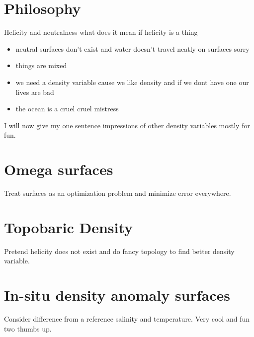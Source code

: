 \documentclass[11pt]{article}
\begin{document}
\section{Philosophy}
\label{sec:orge901af2}
Helicity and neutralness what does it mean if helicity is a thing
\begin{itemize}
\item neutral surfaces don't exist and water doesn't travel neatly on surfaces sorry
\item things are mixed
\item we need a density variable cause we like density and if we dont have one our lives are bad
\item the ocean is a cruel cruel mistress
\end{itemize}

I will now give my one sentence impressions of other density variables mostly for fun.

\section{Omega surfaces}
\label{sec:org78bb93d}
Treat surfaces as an optimization problem and minimize error everywhere.

\section{Topobaric Density}
\label{sec:orgbbca689}
Pretend helicity does not exist and do fancy topology to find better density variable. 

\section{In-situ density anomaly surfaces}
\label{sec:org2f8a50e}
Consider difference from a reference salinity and temperature. Very cool and fun two thumbs up.  
\end{document}
